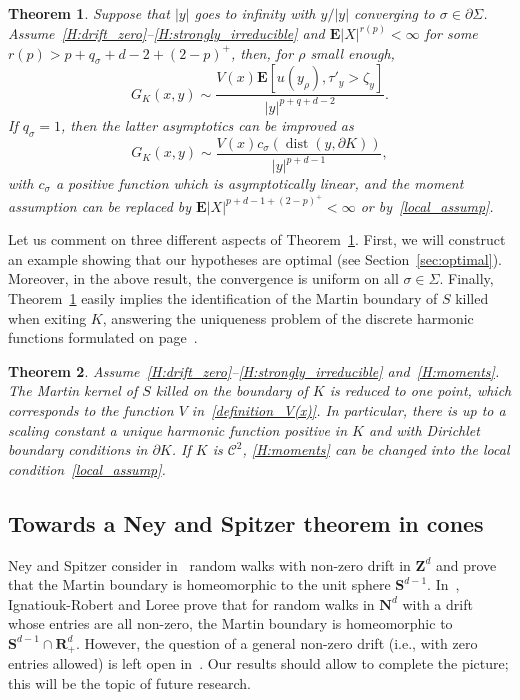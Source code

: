 \documentclass[10pt]{amsart}
\newtheorem{theo}{Theorem}[section]
\theoremstyle{definition}\newtheorem{defi}[theo]{Definition}\newtheorem{rema}[theo]{Remark}\newtheorem{exam}[theo]{Example}\newtheorem{exem}[theo]{Example}\newtheorem{nota}[theo]{Notation}
\DeclareMathOperator{\dist}{dist}
\newcommand{\clC}{\mathcal{C}}
\newcommand{\e}{\mathbf{E}}
\newcommand{\bfS}{\mathbf{S}}
\newcommand{\bfR}{\mathbf{R}}
\newcommand{\bfZ}{\mathbf{Z}}
\newcommand{\bfN}{\mathbf{N}}
\begin{document}
\begin{theo}\label{thm:asymp_Green_boundary}
Suppose that $| y|$ goes to infinity with $y/| y|$ converging to $\sigma\in \partial \Sigma$. Assume~\eqref{H:drift_zero}--\eqref{H:strongly_irreducible} and $\e| X|^{r(p)}<\infty$ for some $r(p)>p+q_{\sigma}+d-2+(2-p)^{+}$, then, for $\rho$ small enough,
\[
G_K(x,y)\sim \frac{V(x) \e\left[u(y_{\rho}),\tau'_{y}>\zeta_{y}\right]}{| y|^{p+q+d-2}}.
\]
If $q_{\sigma}=1$, then the latter asymptotics can be improved as
\[
G_K(x,y)\sim \frac{V(x)c_{\sigma}\left(\dist(y,\partial K)\right)}{| y|^{p+d-1}},
\]
with $c_{\sigma}$ a positive function which is asymptotically linear, and the moment assumption can be replaced by $\e| X|^{p+d-1+(2-p)^{+}}<\infty$ or by~\eqref{local_assump}.
\end{theo}

Let us comment on three different aspects of Theorem~\ref{thm:asymp_Green_boundary}. First, we will construct an example showing that our hypotheses are optimal (see Section~\ref{sec:optimal}). Moreover, in the above result, the convergence is uniform on all $\sigma\in \Sigma$. Finally, Theorem~\ref{thm:asymp_Green_boundary} easily implies the identification of the Martin boundary of $S$ killed when exiting ${K}$, answering the uniqueness problem of the discrete harmonic functions formulated on page~\pageref{page:problem}.


\begin{theo}\label{thm:Martin_boundary}
Assume~\eqref{H:drift_zero}--\eqref{H:strongly_irreducible} and~\eqref{H:moments}. The Martin kernel of $S$ killed on the boundary of ${K}$ is reduced to one point, which corresponds to the function $V$ in~\eqref{definition_V(x)}. In particular, there is up to a scaling constant a unique harmonic function positive in $K$ and with Dirichlet boundary conditions in $\partial K$. If $K$ is $\clC^{2}$, \eqref{H:moments} can be changed into the local condition~\eqref{local_assump}.
\end{theo}




\subsection*{Towards a Ney and Spitzer theorem in cones}

Ney and Spitzer consider in~\cite{NeSp-66} random walks with non-zero drift in $\bfZ^d$ and prove that the Martin boundary is homeomorphic to the unit sphere $\bfS^{d-1}$. In~\cite{IRLo-10,IR-09}, Ignatiouk-Robert and Loree prove that for random walks in $\bfN^d$ with a drift whose entries are all non-zero, the Martin boundary is homeomorphic to $\bfS^{d-1}\cap \bfR_+^d$. However, the question of a general non-zero drift (i.e., with zero entries allowed) is left open in~\cite{IRLo-10,IR-09}. Our results should allow to complete the picture; this will be the topic of future research.
\end{document}
